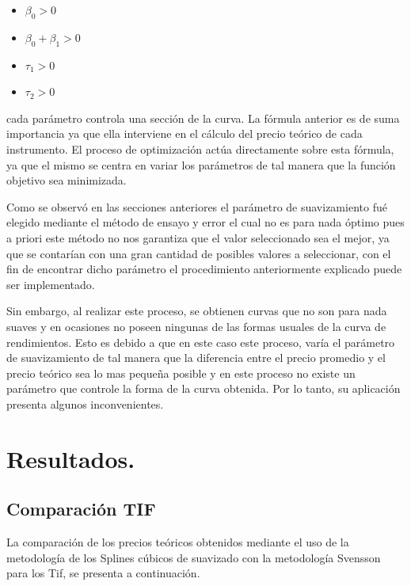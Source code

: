 \begin{itemize}
  \item $\beta_{0} > 0$
  \item $\beta_{0}+\beta_{1} > 0$
  \item $\tau_{1} > 0$
  \item $\tau_{2} > 0$
\end{itemize}

\noindent cada par\'ametro controla una secci\'on de la curva. La f\'ormula anterior es de suma importancia ya que ella interviene en el c\'alculo del precio te\'orico de cada instrumento. El proceso de optimizaci\'on act\'ua directamente sobre esta f\'ormula, ya que el mismo se centra en variar los par\'ametros de tal manera que la funci\'on objetivo sea minimizada.

\hspace{0.4cm} Como se observ\'o en las secciones anteriores el par\'ametro de suavizamiento fu\'e elegido mediante el m\'etodo de ensayo y error el cual no es para nada \'optimo pues a priori este m\'etodo no nos garantiza que el valor seleccionado sea el mejor, ya que se contar\'ian con una gran cantidad de posibles valores a seleccionar, con el fin  de encontrar dicho par\'ametro el procedimiento anteriormente explicado puede ser implementado. 

\hspace{0.4cm} Sin embargo, al realizar este proceso, se obtienen curvas que no son para nada suaves y en ocasiones no poseen ningunas de las formas usuales de la curva de rendimientos. Esto es debido a que en este caso este proceso, var\'ia el par\'ametro de suavizamiento de tal manera que la diferencia entre el precio promedio y el precio te\'orico sea lo mas peque\~na posible y en este proceso no existe un par\'ametro que controle la forma de la curva obtenida. Por lo tanto, su aplicaci\'on presenta algunos inconvenientes.  

\newpage

\section{Resultados.}

\subsection{Comparaci\'on TIF}\hspace{5cm}

\hspace{0.4cm} La comparaci\'on de los precios te\'oricos obtenidos mediante el uso de la metodolog\'ia de los Splines c\'ubicos de suavizado con la metodolog\'ia Svensson para los Tif, se presenta a continuaci\'on.

